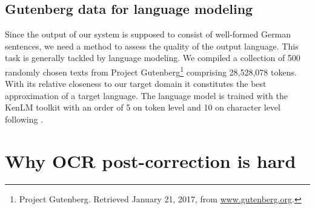 \documentclass[11pt,letterpaper]{article}
\begin{document}
\subsection{Gutenberg data for language modeling}\label{lm}

Since the output of our system is supposed to consist of well-formed German sentences, we 
need a method to assess the quality of the output language. This task is generally tackled by
language modeling. We compiled a collection of 500 randomly 
chosen texts from Project Gutenberg\footnote{Project Gutenberg. Retrieved January 21, 2017, from \url{www.gutenberg.org}.} comprising 28,528,078 tokens. With its relative closeness to our target domain it constitutes the best approximation of a target language.
The language model is trained with the KenLM toolkit \cite{Heafield2011} with an order of 5 on token level and 10 on character level following .

\section{Why OCR post-correction is hard}\label{sec:datadescription}
\end{document}
